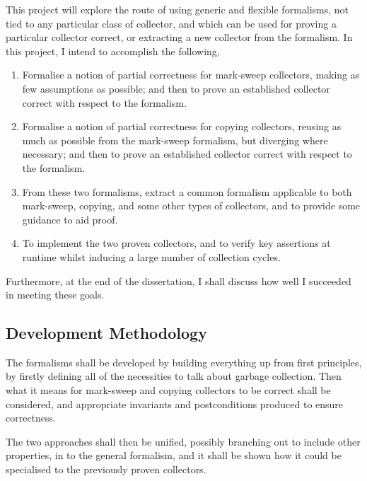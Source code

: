 This project will explore the route of using generic and flexible
formalisms, not tied to any particular class of collector, and which
can be used for proving a particular collector correct, or extracting
a new collector from the formalism. In this project, I intend to
accomplish the following,

\begin{enumerate}
  \item Formalise a notion of partial correctness for mark-sweep
    collectors, making as few assumptions as possible; and then to prove
    an established collector correct with respect to the formalism.

  \item Formalise a notion of partial correctness for copying
    collectors, reusing as much as possible from the mark-sweep
    formalism, but diverging where necessary; and then to prove an
    established collector correct with respect to the formalism.

  \item From these two formalisms, extract a common formalism
    applicable to both mark-sweep, copying, and some other types of
    collectors, and to provide some guidance to aid proof.

  \item To implement the two proven collectors, and to verify key
    assertions at runtime whilst inducing a large number of collection
    cycles.
\end{enumerate}

Furthermore, at the end of the dissertation, I shall discuss how well
I succeeded in meeting these goals.

\subsection{Development Methodology}
\label{sec:intro-goals-development}

The formalisms shall be developed by building everything up from first
principles, by firstly defining all of the necessities to talk about
garbage collection. Then what it means for mark-sweep and copying
collectors to be correct shall be considered, and appropriate
invariants and postconditions produced to ensure correctness.

The two approaches shall then be unified, possibly branching out to
include other properties, in to the general formalism, and it shall be
shown how it could be specialised to the previously proven collectors.

